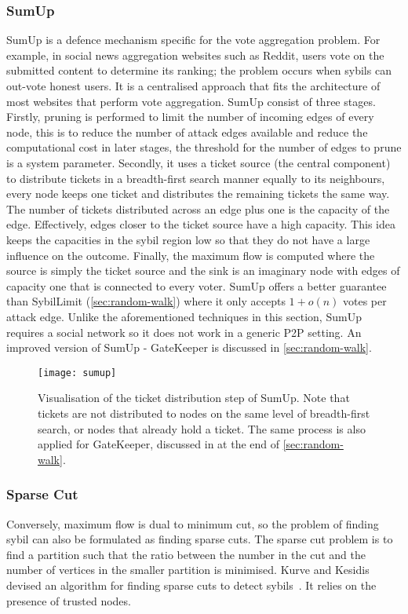 \subsubsection{SumUp}
SumUp\cite{tran2009sybil} is a defence mechanism specific for the vote
aggregation problem. For example, in social news aggregation websites such as
Reddit, users vote on the submitted content to determine its ranking; the
problem occurs when sybils can out-vote honest users. It is a centralised
approach that fits the architecture of most websites that perform vote
aggregation. SumUp consist of three stages. Firstly, pruning is performed to
limit the number of incoming edges of every node, this is to reduce the number
of attack edges available and reduce the computational cost in later stages, the
threshold for the number of edges to prune is a system parameter. Secondly, it
uses a ticket source (the central component) to distribute tickets in a
breadth-first search manner equally to its neighbours, every node keeps one
ticket and distributes the remaining tickets the same way. The number of tickets
distributed across an edge plus one is the capacity of the edge. Effectively,
edges closer to the ticket source have a high capacity. This idea keeps the
capacities in the sybil region low so that they do not have a large influence on
the outcome. Finally, the maximum flow is computed where the source is simply
the ticket source and the sink is an imaginary node with edges of capacity one
that is connected to every voter. SumUp offers a better guarantee than
SybilLimit (\autoref{sec:random-walk}) where it only accepts $1 + o(n)$ votes
per attack edge. Unlike the aforementioned techniques in this section, SumUp
requires a social network so it does not work in a generic P2P setting. An
improved version of SumUp - GateKeeper is discussed in
\autoref{sec:random-walk}.

\begin{figure}
  \centering
  \texttt{[image: sumup]}
  \caption{Visualisation of the ticket distribution step of SumUp. Note that
    tickets are not distributed to nodes on the same level of breadth-first
    search, or nodes that already hold a ticket. The same process is also
    applied for GateKeeper, discussed in at the end of
    \autoref{sec:random-walk}.}
  \label{fig:sumup}
\end{figure}

\subsubsection{Sparse Cut}
Conversely, maximum flow is dual to minimum cut, so the problem of finding sybil
can also be formulated as finding sparse cuts. The sparse cut problem is to find
a partition such that the ratio between the number in the cut and the number of
vertices in the smaller partition is minimised. Kurve and Kesidis devised an
algorithm for finding sparse cuts to detect sybils~\cite{kurve2011sybil}. It
relies on the presence of trusted nodes.

